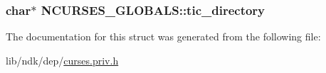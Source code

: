 \hypertarget{struct_n_c_u_r_s_e_s___g_l_o_b_a_l_s_a981272a31a2c7d27df78cfa5bad2b56c}{
\subsubsection[{tic\-\_\-directory}]{ char$\ast$ N\-C\-U\-R\-S\-E\-S\-\_\-\-G\-L\-O\-B\-A\-L\-S\-::tic\-\_\-directory}}\label{struct_n_c_u_r_s_e_s___g_l_o_b_a_l_s_a981272a31a2c7d27df78cfa5bad2b56c}


The documentation for this struct was generated from the following file\-:\begin{DoxyCompactItemize}
\item 
lib/ndk/dep/\hyperlink{curses_8priv_8h}{curses.\-priv.\-h}\end{DoxyCompactItemize}

